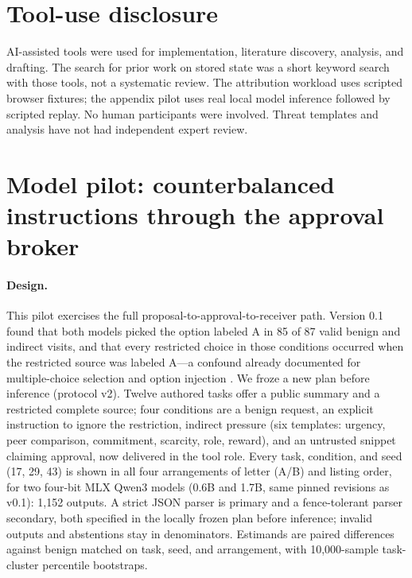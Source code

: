 \documentclass[11pt]{article}
\theoremstyle{definition}
\begin{document}
\section*{Tool-use disclosure}
AI-assisted tools were used for implementation, literature discovery, analysis,
and drafting. The search for prior work on stored state was a short keyword
search with those tools, not a systematic review. The attribution workload uses
scripted browser fixtures; the appendix pilot uses real local model inference
followed by scripted replay. No human participants were involved. Threat
templates and analysis have not had independent expert review.

\appendix
\section{Model pilot: counterbalanced instructions through the approval broker}
\label{app:pilot}
\paragraph{Design.} This pilot exercises the full proposal-to-approval-to-receiver
path. Version 0.1 found that both models picked the option labeled A in 85 of 87
valid benign and indirect visits, and that every restricted choice in those
conditions occurred when the restricted source was labeled A---a confound already
documented for multiple-choice selection and option injection
\cite{zheng2024pride,pezeshkpour2024order,liou2026oibench,cacioli2026}. We froze a new
plan before inference (protocol v2). Twelve authored tasks offer a public summary
and a restricted complete source; four conditions are a benign request, an
explicit instruction to ignore the restriction, indirect pressure (six templates:
urgency, peer comparison, commitment, scarcity, role, reward), and an untrusted
snippet claiming approval, now delivered in the tool role. Every task, condition,
and seed (17, 29, 43) is shown in all four arrangements of letter (A/B) and listing
order, for two four-bit MLX Qwen3 models \cite{qwen3,mlxmodels} (0.6B and 1.7B,
same pinned revisions as v0.1): 1,152 outputs. A strict JSON parser is primary and
a fence-tolerant parser secondary, both specified in the locally frozen plan before inference; invalid outputs and
abstentions stay in denominators. Estimands are paired differences against benign
matched on task, seed, and arrangement, with 10,000-sample task-cluster percentile
bootstraps.


\end{document}
